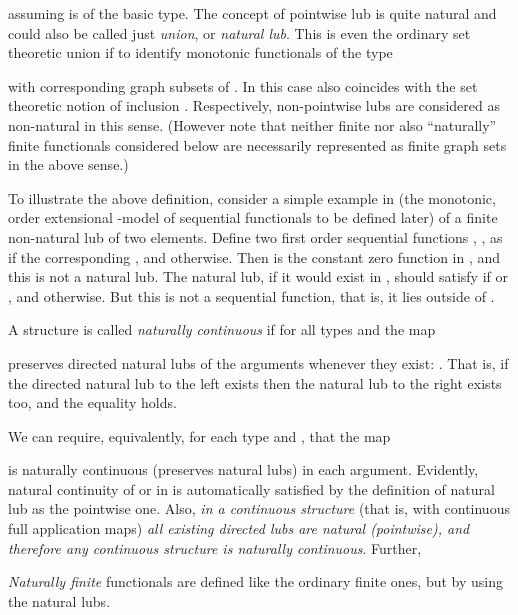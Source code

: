 \documentclass[fleqn]{LMCS}
\theoremstyle{plain}\newtheorem{satz}[thm]{Satz}
\theoremstyle{plain}\newtheorem{hyp}[thm]{Hypothesis}
\theoremstyle{plain}\newtheorem{hyps}[thm]{Hypotheses}
\theoremstyle{definition}\newtheorem{note}[thm]{Note}
\newcommand{\?}{\mbox{?}}
\begin{document}
assuming  is of the basic type. 
The concept of pointwise lub is quite natural and could also be called 
just \emph{union}, or \emph{natural lub}. 
This is even the ordinary set theoretic union 
if to identify monotonic functionals of the type 
 
with corresponding graph subsets of 
. 
In this case  also coincides with the set theoretic notion of inclusion 
. 
Respectively, non-pointwise lubs are considered as non-natural in this sense. 
(However note that neither finite nor also ``naturally'' finite functionals 
considered below are necessarily represented as finite graph sets in the above sense.) 


\begin{exa}\label{ex:O_i}To illustrate the above definition, 
consider a simple example in  (the monotonic, 
order extensional -model of sequential functionals 
to be defined later) of a finite non-natural lub of two 
elements. 
Define two first order sequential functions 
, , 
as  if the corresponding , and  otherwise. 
Then  
 is the constant zero function 
in , and this is not a natural  lub. 
The natural  lub, if it would exist in , should satisfy 
 if  or , 
and  otherwise. But this is not a sequential function, 
that is, it lies outside of . 
\end{exa}



\begin{defi}A structure  is called \emph{naturally  {continuous}} 
if for all types  and  the map
 
preserves directed natural lubs of the arguments whenever they exist:
\label{page:pointwise-continuity}
.
That is, if the directed natural lub to the left exists then 
the natural lub to the right exists too, and the equality holds. 
\end{defi}

\noindent
We can require, equivalently, for each type 
 and 
,  
that the map 

is naturally  {continuous} (preserves natural  lubs) in each argument. 
Evidently, natural  continuity of  or  in  
is automatically satisfied by the definition of natural lub as the pointwise one. 
Also, \emph{in a continuous structure} 
(that is, with continuous full application maps)
\emph{all existing directed lubs are natural (pointwise), and therefore 
any continuous structure is naturally continuous}. 
Further, 
\begin{defi}\emph{Naturally finite} functionals 
are defined like the ordinary finite ones, but by using the natural  lubs. 
\end{defi}
\end{document}
